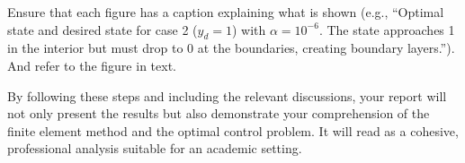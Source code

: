 \documentclass[a4paper,10pt]{report}
\begin{document}
Ensure that each figure has a caption explaining what is shown (e.g., “Optimal state and desired state for case 2 (\(y_d=1\)) with \(\alpha=10^{-6}\). The state approaches 1 in the interior but must drop to 0 at the boundaries, creating boundary layers.”). And refer to the figure in text.

By following these steps and including the relevant discussions, your report will not only present the results but also demonstrate your comprehension of the finite element method and the optimal control problem. It will read as a cohesive, professional analysis suitable for an academic setting.
\end{document}
